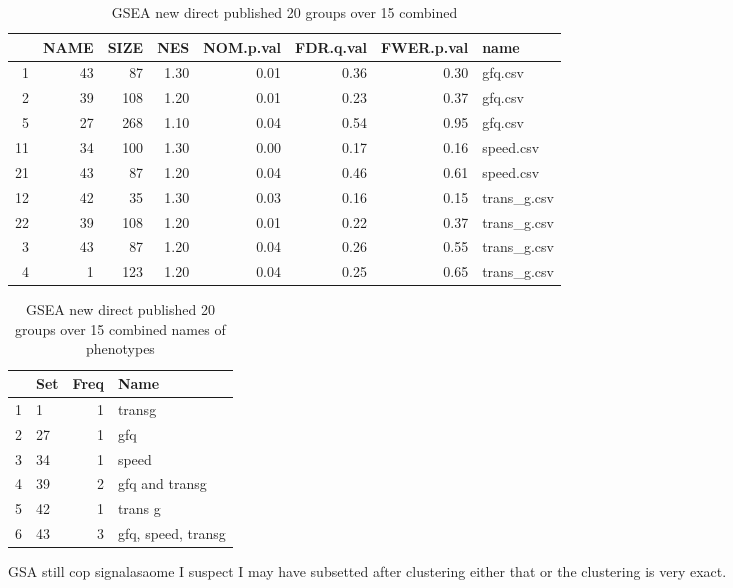\begin{table}[ht]
\centering
\begin{tabular}{rrrrrrrl}
  \hline
 & NAME & SIZE & NES & NOM.p.val & FDR.q.val & FWER.p.val & name \\ 
  \hline
1 &  43 &  87 & 1.30 & 0.01 & 0.36 & 0.30 & gfq.csv \\ 
  2 &  39 & 108 & 1.20 & 0.01 & 0.23 & 0.37 & gfq.csv \\ 
  5 &  27 & 268 & 1.10 & 0.04 & 0.54 & 0.95 & gfq.csv \\ 
  11 &  34 & 100 & 1.30 & 0.00 & 0.17 & 0.16 & speed.csv \\ 
  21 &  43 &  87 & 1.20 & 0.04 & 0.46 & 0.61 & speed.csv \\ 
  12 &  42 &  35 & 1.30 & 0.03 & 0.16 & 0.15 & trans\_g.csv \\ 
  22 &  39 & 108 & 1.20 & 0.01 & 0.22 & 0.37 & trans\_g.csv \\ 
  3 &  43 &  87 & 1.20 & 0.04 & 0.26 & 0.55 & trans\_g.csv \\ 
  4 &   1 & 123 & 1.20 & 0.04 & 0.25 & 0.65 & trans\_g.csv \\ 
   \hline
\end{tabular}
\caption{GSEA new direct published 20 groups over 15 combined} 
\label{combined_newpublished}
\end{table}

\begin{table}[ht]
\centering
\begin{tabular}{rlrl}
  \hline
 & Set & Freq & Name\\ 
  \hline
1 & 1 &   1 & transg\\ 
  2 & 27 &   1 &gfq \\
  3 & 34 &   1 &speed \\ 
  4 & 39 &   2 & gfq and transg\\ 
  5 & 42 &   1 & trans g\\ 
  6 & 43 &   3 & gfq, speed, transg\\ 
   \hline
\end{tabular}
\caption{GSEA new direct published 20 groups over 15 combined names of phenotypes} 
\label{combined_newpublished_names}
\end{table}

GSA still cop signalasaome I suspect I may have subsetted after clustering either that or the clustering is very exact. 
